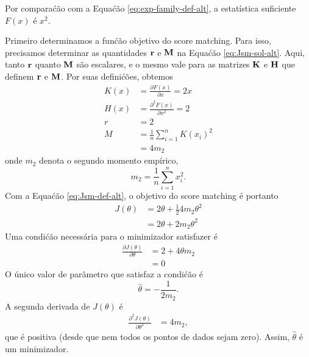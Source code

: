 \begin{exenumerate}
    \begin{solution}
        Por compara\'c\~ao com a Equa\'c\~ao \eqref{eq:exp-family-def-alt}, a
        estat\'istica suficiente $F(x)$ \'e $x^2$.
        
        Primeiro determinamos a fun\'c\~ao objetivo do score matching. Para
        isso, precisamos determinar as quantidades $\mathbf{r}$ e $\mathbf{M}$ na
        Equa\'c\~ao \eqref{eq:Jsm-sol-alt}. Aqui, tanto $\mathbf{r}$ quanto $\mathbf{M}$ s\~ao escalares,
        e o mesmo vale para as matrizes $\mathbf{K}$ e $\mathbf{H}$ que definem $\mathbf{r}$ e $\mathbf{M}$. Por
        suas defini\'c\~oes, obtemos
        \begin{align}
            K(x) &=  \frac{\partial F(x)}{\partial x} = 2x\\
            H(x) &= \frac{\partial^2 F(x)}{\partial x^2} = 2\\
            r & = 2\\
            M &=  \frac{1}{n}\sum_{i=1}^n K(x_i)^2 \\
            & = 4 m_2
        \end{align}
        onde $m_2$ denota o segundo momento emp\'irico,
        \begin{equation}
            m_2 = \frac{1}{n} \sum_{i=1}^n x_i^2.
        \end{equation}
        Com a Equa\'c\~ao \eqref{eq:Jsm-def-alt}, o objetivo do score matching \'e portanto
        \begin{align}
            J(\theta) &= 2 \theta + \frac{1}{2} 4 m_2 \theta^2 \\
            & = 2 \theta + 2 m_2 \theta^2
        \end{align}
        Uma condi\'c\~ao necess\'aria para o minimizador satisfazer \'e
        \begin{align}
            \frac{\partial J(\theta)}{\partial \theta} & = 2 + 4 \theta m_2 \\
            & = 0
        \end{align}
        O \'unico valor de par\^ametro que satisfaz a condi\'c\~ao \'e
        \begin{equation}
            \hat{\theta} = -\frac{1}{2 m_2}.
        \end{equation}
        A segunda derivada de $J(\theta)$ \'e
        \begin{align}
            \frac{\partial^2 J(\theta)}{\partial \theta^2} & = 4 m_2,
        \end{align}
        que \'e positiva (desde que nem todos os pontos de dados sejam zero). Assim, $\hat{\theta}$ \'e um minimizador.
        

\end{solution}
\end{exenumerate}
